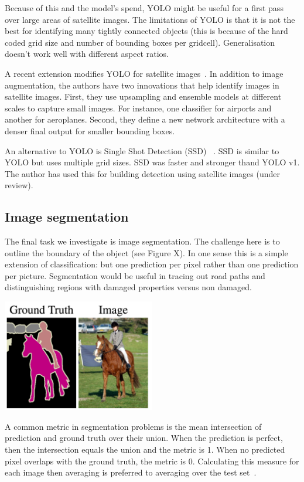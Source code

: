 \documentclass[12pt, a4paper, oneside, headinclude, footinclude]{article}
\begin{document}
Because of this and the model's spend, YOLO might be useful for a first pass
over large areas of satellite images. The limitations of YOLO is that it is
not the best for identifying many tightly connected objects (this is because
of the hard coded grid size and number of bounding boxes per gridcell).
Generalisation doesn't work well with different aspect ratios. 

A recent extension modifies YOLO for satellite images~\cite{YOLT}. In addition
to image augmentation, the authors have two innovations that help identify
images in satellite images. First, they use upsampling and ensemble models
at different scales to capture small images. For instance, one classifier for
airports and another for aeroplanes. Second, they define a new network
architecture with a denser final output for smaller bounding boxes.


An alternative to YOLO is Single Shot Detection (SSD) ~\cite{liu2016ssd}. SSD
is similar to YOLO but uses multiple grid sizes. SSD was faster and stronger
thand YOLO v1. The author has used this for building detection using satellite
images (under review).

\subsection{Image segmentation}

The final task we investigate is image segmentation. The challenge here is to
outline the boundary of the object (see Figure X). In one sense this is a
simple extension of classification: but one prediction per pixel rather than
one prediction per picture. Segmentation would be useful in tracing out road
paths and distinguishing regions with damaged properties versus non damaged. 

\includegraphics[width=0.5\textwidth]{Figures/segmentation-example.png}

A common metric in segmentation problems is the mean intersection of
prediction and ground truth over their union. When the prediction is perfect,
then the intersection equals the union and the metric is 1. When no predicted
pixel overlaps with the ground truth, the metric is 0. Calculating this
measure for each image then averaging is preferred to averaging over the test
set~\cite{csurka2013good}.
\end{document}
